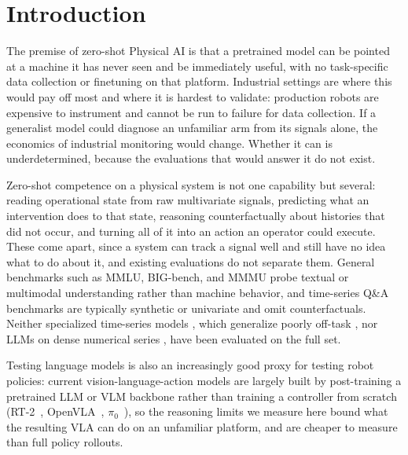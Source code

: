 \section{Introduction}

The premise of zero-shot Physical AI is that a pretrained model can be pointed at a machine it has never seen and be immediately useful, with no task-specific data collection or finetuning on that platform. Industrial settings are where this would pay off most and where it is hardest to validate: production robots are expensive to instrument and cannot be run to failure for data collection. If a generalist model could diagnose an unfamiliar arm from its signals alone, the economics of industrial monitoring would change. Whether it can is underdetermined, because the evaluations that would answer it do not exist.

Zero-shot competence on a physical system is not one capability but several: reading operational state from raw multivariate signals, predicting what an intervention does to that state, reasoning counterfactually about histories that did not occur, and turning all of it into an action an operator could execute. These come apart, since a system can track a signal well and still have no idea what to do about it, and existing evaluations do not separate them. General benchmarks such as MMLU, BIG-bench, and MMMU \cite{hendrycks2021mmlu,srivastava2023bigbench,yue2024mmmu} probe textual or multimodal understanding rather than machine behavior, and time-series Q\&A benchmarks are typically synthetic or univariate and omit counterfactuals. Neither specialized time-series models \cite{zhou2021informer,su2019omni,audibert2020usad}, which generalize poorly off-task \cite{chalapathy2019survey,lavin2015numenta,zeng2023transformers}, nor LLMs on dense numerical series \cite{gruver2023llmtime,jin2024timellm}, have been evaluated on the full set.



Testing language models is also an increasingly good proxy for testing robot policies: current vision-language-action models are largely built by post-training a pretrained LLM or VLM backbone rather than training a controller from scratch (RT-2~\cite{brohan2023rt2}, OpenVLA~\cite{kim2024openvla}, $\pi_0$~\cite{black2024pi0}), so the reasoning limits we measure here bound what the resulting VLA can do on an unfamiliar platform, and are cheaper to measure than full policy rollouts.

